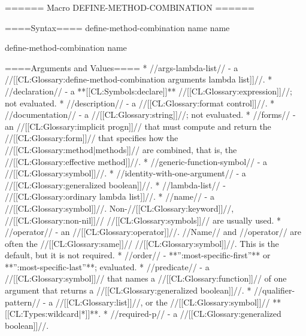====== Macro DEFINE-METHOD-COMBINATION ======

====Syntax====
\DefmacWithValuesNewline define-method-combination {name } {name}

\DefmacWithValuesNewline define-method-combination {} {name}


====Arguments and Values====
  * //args-lambda-list// - a //[[CL:Glossary:define-method-combination arguments lambda list]]//.
  * //declaration// - a **[[CL:Symbols:declare]]** //[[CL:Glossary:expression]]//; not evaluated.
  * //description// - a //[[CL:Glossary:format control]]//.
  * //documentation// - a //[[CL:Glossary:string]]//; not evaluated.
  * //forms// - an //[[CL:Glossary:implicit progn]]// that must compute and return the //[[CL:Glossary:form]]// that specifies how the //[[CL:Glossary:method|methods]]// are combined, that is, the //[[CL:Glossary:effective method]]//.
  * //generic-function-symbol// - a //[[CL:Glossary:symbol]]//.
  * //identity-with-one-argument// - a //[[CL:Glossary:generalized boolean]]//.
  * //lambda-list// - //[[CL:Glossary:ordinary lambda list]]//.
  * //name// - a //[[CL:Glossary:symbol]]//. Non-//[[CL:Glossary:keyword]]//, //[[CL:Glossary:non-nil]]// //[[CL:Glossary:symbols]]// are usually used.
  * //operator// - an //[[CL:Glossary:operator]]//. //Name// and //operator// are often the //[[CL:Glossary:same]]// //[[CL:Glossary:symbol]]//. This is the default, but it is not required.
  * //order// - **'':most-specific-first''** or **'':most-specific-last''**; evaluated.
  * //predicate// - a //[[CL:Glossary:symbol]]// that names a //[[CL:Glossary:function]]// of one argument that returns a //[[CL:Glossary:generalized boolean]]//.
  * //qualifier-pattern// - a //[[CL:Glossary:list]]//, or the //[[CL:Glossary:symbol]]// **[[CL:Types:wildcard|*]]**.
  * //required-p// - a //[[CL:Glossary:generalized boolean]]//.

